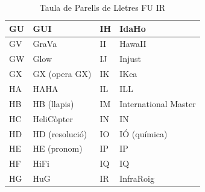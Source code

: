 \begin{table}[ht]
\begin{tabular}{|l|l|l|l|}
        GU & GUI            & IH & IdaHo                \\\hline
        GV & GraVa          & II & HawaII               \\\hline
        GW & Glow           & IJ & Injust               \\\hline
        GX & GX (opera GX)  & IK & IKea                 \\\hline
        HA & HAHA           & IL & ILL                  \\\hline
        HB & HB (llapis)    & IM & International Master \\\hline
        HC & HeliCòpter     & IN & IN                   \\\hline
        HD & HD (resolució) & IO & IÓ (química)         \\\hline
        HE & HE (pronom)    & IP & IP                   \\\hline
        HF & HiFi           & IQ & IQ                   \\\hline
        HG & HuG            & IR & InfraRoig            \\\hline
    \end{tabular}
    \caption{Taula de Parells de Lletres FU \rightarrow IR}
    \label{tla:lletres-3}
\end{table}

